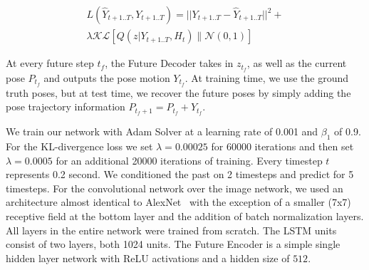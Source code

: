 \vspace{-.3cm}
\begin{equation}
\begin{split}
L(\hat{Y}_{t+1..T},Y_{t+1..T}) = ||Y_{t+1..T} - \hat{Y}_{t+1..T}||^{2} +
\\
\lambda\mathcal{KL}\left[Q(z|Y_{t+1..T},H_t)\|\mathcal{N}(0,1)\right]
\label{eq:VAE}
\end{split}
\end{equation}
\vspace{-.3cm}

At every future step $t_f$, the Future Decoder takes in $z_{t_f}$, as well as the current pose $P_{t_f}$ and outputs the pose motion $Y_{t_f}$. At training time, we use the ground truth poses, but at test time, we recover the future poses by simply adding the pose trajectory information $P_{t_f+1}=P_{t_f}+Y_{t_f}$. 

 We train our network with Adam Solver at a learning rate of 0.001 and $\beta_{1}$ of 0.9. For the KL-divergence loss we set $\lambda=0.00025$ for 60000 iterations and then set $\lambda=0.0005$ for an additional 20000 iterations of training. Every timestep $t$ represents 0.2 second. We conditioned the past on 2 timesteps and predict for 5 timesteps. For the convolutional network over the image network, we used an architecture almost identical to AlexNet~\cite{Krizhevsky12} with the exception of a smaller (7x7) receptive field at the bottom layer and the addition of batch normalization layers. All layers in the entire network were trained from scratch. The LSTM units consist of two layers, both 1024 units. The Future Encoder is a simple single hidden layer network with ReLU activations and a hidden size of $512$. 


